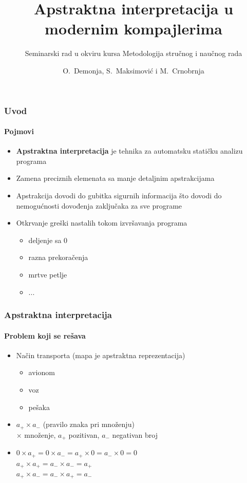 \documentclass[xetex,mathserif,serif]{beamer}
\title %
{Apstraktna interpretacija u modernim kompajlerima}
\subtitle{Seminarski rad u okviru kursa Metodologija stručnog i naučnog rada}
\author[Demonja, Maksimović, Crnobrnja] %
{O.~Demonja, S.~Maksimović i M.~Crnobrnja}
\institute%
{
  Matematički fakultet\\
  Univerzitet u beogradu
}
\date %
\begin{document}
  \frame{\titlepage}
  
  \begin{frame}
    \frametitle{Uvod}
	    \framesubtitle{Pojmovi}
		\begin{center}
		\begin{itemize}
			\item \textbf{Apstraktna interpretacija} je tehnika za automatsku statičku analizu programa
			\item Zamena preciznih elemenata sa manje detaljnim apstrakcijama
			\item Apstrakcija dovodi do gubitka sigurnih informacija što dovodi do nemogućnosti dovođenja zaključaka za sve programe
			\item Otkrvanje greški nastalih tokom izvršavanja programa 
				\begin{itemize}
					\item deljenje sa 0
					\item razna prekoračenja
					\item mrtve petlje
					\item ...
				\end{itemize}
		\end{itemize}
	\end{center}
  \end{frame}  
  
  \begin{frame}
    \frametitle{Apstraktna interpretacija}
	    \framesubtitle{Problem koji se rešava}
		\begin{center}
			\begin{itemize}
			\item {Način transporta} \only<2-4> {(mapa je apstraktna reprezentacija)}
			\begin{itemize}
				\item avionom
				\item voz
				\item pešaka
			\end{itemize}

			\pause			
			\pause			
			
	        \item $a_{+} \times a_{-}$ \only<4> {(pravilo znaka pri množenju)}\\
    	    {\color{cyan} $\times$ množenje, $a_{+}$ pozitivan, $a_{-}$ negativan broj}
    	\end{itemize}

   		 \begin{itemize}
     		\item $0 \times a_{+} = 0 \times a_{-} = a_{+} \times 0 = a_{-} \times 0 = 0$ \\
     		$a_{+} \times a_{+} = a_{-} \times a_{-} = a_{+}$ \\
     		$a_{+} \times a_{-} = a_{-} \times a_{+} = a_{-}$
    	\end{itemize}
	\end{center}
  \end{frame}    
  
\end{document}
